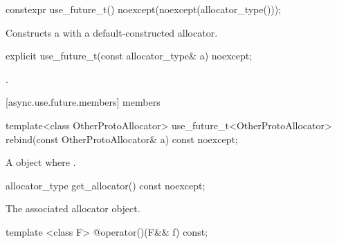 \begin{itemdecl}
constexpr use_future_t() noexcept(noexcept(allocator_type()));
\end{itemdecl}

\begin{itemdescr}
\pnum
\effects Constructs a  with a default-constructed allocator.
\end{itemdescr}

\begin{itemdecl}
explicit use_future_t(const allocator_type& a) noexcept;
\end{itemdecl}

\begin{itemdescr}
\pnum
\postconditions {}.
\end{itemdescr}



[async.use.future.members]{ members}

\begin{itemdecl}
template<class OtherProtoAllocator> use_future_t<OtherProtoAllocator>
  rebind(const OtherProtoAllocator& a) const noexcept;
\end{itemdecl}

\begin{itemdescr}
\pnum
\returns A  object where .
\end{itemdescr}

\begin{itemdecl}
allocator_type get_allocator() const noexcept;
\end{itemdecl}

\begin{itemdescr}
\pnum
\returns The associated allocator object.
\end{itemdescr}

\begin{itemdecl}
template <class F> @\unspec@ operator()(F&& f) const;
\end{itemdecl}

